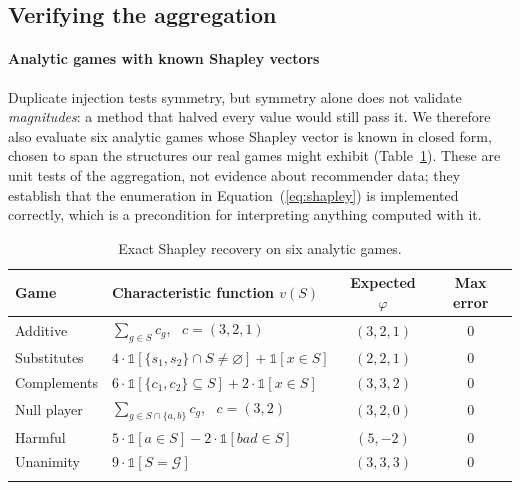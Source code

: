 \documentclass[pdflatex,sn-basic,Numbered]{sn-jnl}
\theoremstyle{plain}
\theoremstyle{definition}
\newcommand{\G}{\mathcal{G}}
\begin{document}
\subsection{Verifying the aggregation}\label{sec:validating}

\paragraph{Analytic games with known Shapley vectors}\label{sec:analytic}

Duplicate injection tests symmetry, but symmetry alone does not validate
\emph{magnitudes}: a method that halved every value would still pass it. We
therefore also evaluate six analytic games whose Shapley vector is known in
closed form, chosen to span the structures our real games might exhibit
(Table~\ref{tab:analytic}). These are unit tests of the aggregation, not
evidence about recommender data; they establish that the enumeration in
Equation~(\ref{eq:shapley}) is implemented correctly, which is a precondition for interpreting
anything computed with it.

\begin{table}[tbp]
\caption{Exact Shapley recovery on six analytic games.}
\label{tab:analytic}
\small
\begin{tabular}{@{}lp{}cc@{}}
\toprule
Game & Characteristic function $v(S)$ & Expected $\varphi$ & Max error \\
\midrule
Additive     & $\sum_{g\in S} c_g$, \ $c=(3,2,1)$                & $(3, 2, 1)$  & $0$ \\
Substitutes  & $4\cdot\mathbb{1}[\{s_1,s_2\}\cap S \neq \varnothing] + \mathbb{1}[x\in S]$
                                                                  & $(2, 2, 1)$  & $0$ \\
Complements  & $6\cdot\mathbb{1}[\{c_1,c_2\}\subseteq S] + 2\cdot\mathbb{1}[x\in S]$
                                                                  & $(3, 3, 2)$  & $0$ \\
Null player  & $\sum_{g\in S\cap\{a,b\}} c_g$, \ $c=(3,2)$        & $(3, 2, 0)$  & $0$ \\
Harmful      & $5\cdot\mathbb{1}[a\in S] - 2\cdot\mathbb{1}[\mathit{bad}\in S]$
                                                                  & $(5, -2)$    & $0$ \\
Unanimity    & $9\cdot\mathbb{1}[S = \G]$                          & $(3, 3, 3)$  & $0$ \\
\botrule
\end{tabular}
\end{table}
\end{document}
